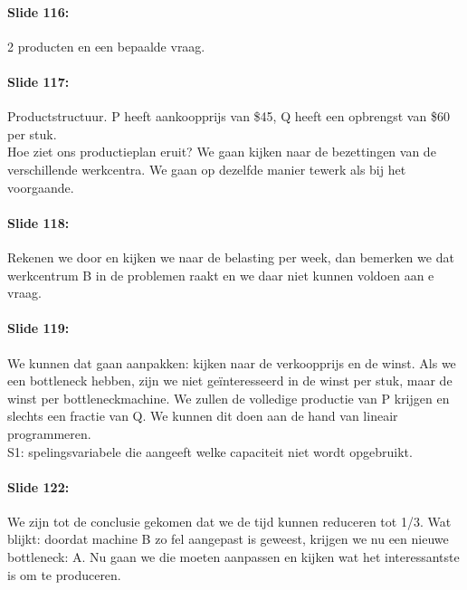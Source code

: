 \documentclass[10pt,a4paper]{report}
\begin{document}
\paragraph{Slide 116:} 2 producten en een bepaalde vraag.

\paragraph{Slide 117:} Productstructuur. P heeft aankoopprijs van \$45, Q heeft een opbrengst van \$60 per stuk.\\
Hoe ziet ons productieplan eruit? We gaan kijken naar de bezettingen van de verschillende werkcentra. We gaan op dezelfde manier tewerk als bij het voorgaande. 

\paragraph{Slide 118:} Rekenen we door en kijken we naar de belasting per week, dan bemerken we dat werkcentrum B in de problemen raakt en we daar niet kunnen voldoen aan e vraag.

\paragraph{Slide 119:} We kunnen dat gaan aanpakken: kijken naar de verkoopprijs en de winst. Als we een bottleneck hebben, zijn we niet ge\"interesseerd in de winst per stuk, maar de winst per bottleneckmachine. We zullen de volledige productie van P krijgen en slechts een fractie van Q.
We kunnen dit doen aan de hand van lineair programmeren.\\
S1: spelingsvariabele die aangeeft welke capaciteit niet wordt opgebruikt. 

\paragraph{Slide 122:} We zijn tot de conclusie gekomen dat we de tijd kunnen reduceren tot 1/3. Wat blijkt: doordat machine B zo fel aangepast is geweest, krijgen we nu een nieuwe bottleneck: A. Nu gaan we die moeten aanpassen en kijken wat het interessantste is om te produceren.
\end{document}
